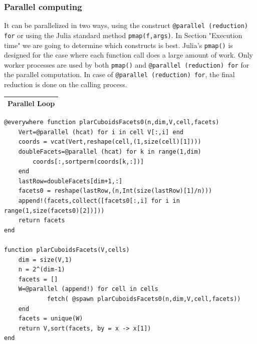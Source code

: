 \documentclass{article}
\begin{document}
\subsubsection{Parallel computing}
\vspace{1ex}
It can be parallelized in two ways, using the construct \texttt{@parallel (reduction) for} or using the Julia standard method \texttt{pmap(f,args)}.
In Section "Execution time" we are going to determine which constructs is best.
Julia's \texttt{pmap()} is designed for the case where each function call does a large amount of work. Only worker processes are used by both  \texttt{pmap()} and \texttt{@parallel (reduction) for} for the parallel computation. In case of \texttt{@parallel (reduction) for}, the final reduction is done on the calling process.
\vspace{2ex}
\begin{flushleft} \small
\begin{center}
\begin{tabular}{|p{16cm}|}
\hline
\cellcolor[gray]{.9}Parallel Loop\\
\hline
\end{tabular}
\end{center}
\vspace{2ex}
\begin{list}{}{} \item
   \begin{Verbatim}[tabsize=4]
@everywhere function plarCuboidsFacets0(n,dim,V,cell,facets)
	Vert=@parallel (hcat) for i in cell V[:,i] end
	coords = vcat(Vert,reshape(cell,(1,size(cell)[1])))
	doubleFacets=@parallel (hcat) for k in range(1,dim)
		coords[:,sortperm(coords[k,:])] 
	end
	lastRow=doubleFacets[dim+1,:]
	facets0 = reshape(lastRow,(n,Int(size(lastRow)[1]/n)))
	append!(facets,collect([facets0[:,i] for i in range(1,size(facets0)[2])]))
	return facets
end

function plarCuboidsFacets(V,cells)
	dim = size(V,1)
	n = 2^(dim-1)
	facets = []
	W=@parallel (append!) for cell in cells
			fetch( @spawn plarCuboidsFacets0(n,dim,V,cell,facets))
	end
	facets = unique(W)
	return V,sort(facets, by = x -> x[1])
end


\end{Verbatim}
\end{list}
\end{flushleft}
\end{document}
